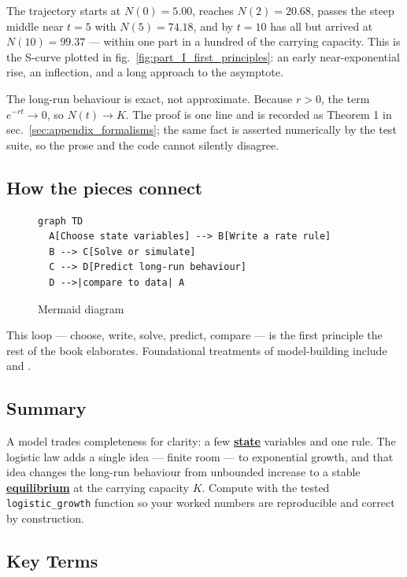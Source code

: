 \documentclass[
]{article}
\theoremstyle{plain}
\theoremstyle{definition}
\begin{document}
The trajectory starts at \(N(0) = 5.00\), reaches \(N(2) = 20.68\),
passes the steep middle near \(t = 5\) with \(N(5) = 74.18\), and by
\(t = 10\) has all but arrived at \(N(10) = 99.37\) --- within one part
in a hundred of the carrying capacity. This is the S-curve plotted in
fig.~\ref{fig:part_I_first_principles}: an early near-exponential rise,
an inflection, and a long approach to the asymptote.

The long-run behaviour is exact, not approximate. Because \(r > 0\), the
term \(e^{-rt} \to 0\), so \(N(t) \to K\). The proof is one line and is
recorded as Theorem 1 in sec.~\ref{sec:appendix_formalisms}; the same
fact is asserted numerically by the test suite, so the prose and the
code cannot silently disagree.

\subsection{How the pieces connect}\label{how-the-pieces-connect}

\begin{figure}[htbp]
\centering
\begin{verbatim}
graph TD
  A[Choose state variables] --> B[Write a rate rule]
  B --> C[Solve or simulate]
  C --> D[Predict long-run behaviour]
  D -->|compare to data| A
\end{verbatim}
\caption{Mermaid diagram}
\end{figure}

This loop --- choose, write, solve, predict, compare --- is the first
principle the rest of the book elaborates. Foundational treatments of
model-building include \citep{brown2017principles} and
\citep{patel2018models}.

\subsection{Summary}\label{summary-3}

A model trades completeness for clarity: a few
\hyperref[gl:state]{\textbf{state}} variables and one rule. The logistic
law adds a single idea --- finite room --- to exponential growth, and
that idea changes the long-run behaviour from unbounded increase to a
stable \hyperref[gl:equilibrium]{\textbf{equilibrium}} at the carrying
capacity \(K\). Compute with the tested \texttt{logistic\_growth}
function so your worked numbers are reproducible and correct by
construction.

\subsection{Key Terms}\label{key-terms-3}
\end{document}
